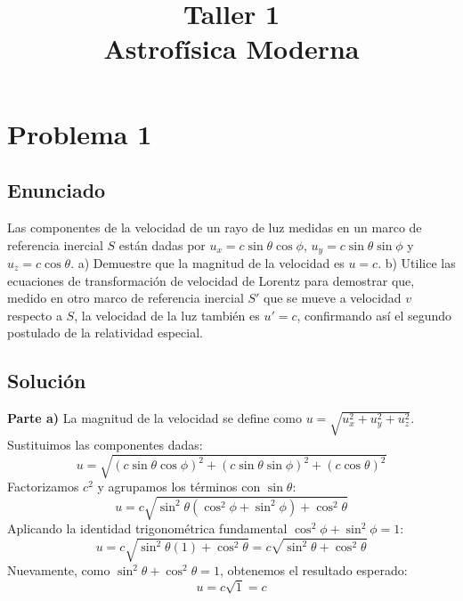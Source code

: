 \documentclass[a4paper,11pt]{article}
\title{Taller 1\\[0.3em]\large Astrofísica Moderna}
\author{}
\date{}
\begin{document}
\maketitle

\section{Problema 1}

\subsection{Enunciado}
Las componentes de la velocidad de un rayo de luz medidas en un marco de referencia inercial $S$ están dadas por $u_x = c \sin\theta \cos\phi$, $u_y = c \sin\theta \sin\phi$ y $u_z = c \cos\theta$. 
a) Demuestre que la magnitud de la velocidad es $u = c$. 
b) Utilice las ecuaciones de transformación de velocidad de Lorentz para demostrar que, medido en otro marco de referencia inercial $S'$ que se mueve a velocidad $v$ respecto a $S$, la velocidad de la luz también es $u' = c$, confirmando así el segundo postulado de la relatividad especial.

\subsection{Solución}
\textbf{Parte a)}
La magnitud de la velocidad se define como $u = \sqrt{u_x^2 + u_y^2 + u_z^2}$. Sustituimos las componentes dadas:
$$ u = \sqrt{(c \sin\theta \cos\phi)^2 + (c \sin\theta \sin\phi)^2 + (c \cos\theta)^2} $$
Factorizamos $c^2$ y agrupamos los términos con $\sin\theta$:
$$ u = c \sqrt{\sin^2\theta (\cos^2\phi + \sin^2\phi) + \cos^2\theta} $$
Aplicando la identidad trigonométrica fundamental $\cos^2\phi + \sin^2\phi = 1$:
$$ u = c \sqrt{\sin^2\theta (1) + \cos^2\theta} = c \sqrt{\sin^2\theta + \cos^2\theta} $$
Nuevamente, como $\sin^2\theta + \cos^2\theta = 1$, obtenemos el resultado esperado:
$$ u = c \sqrt{1} = c $$
\end{document}
